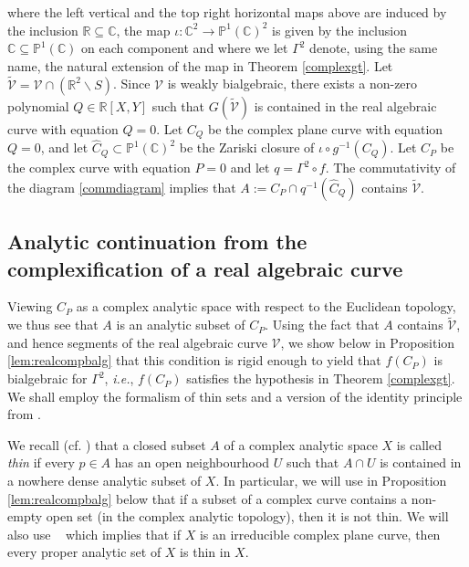 \documentclass[11pt,reqno]{amsart}
\theoremstyle{definition}
\numberwithin{equation}{section}
\renewcommand{\tilde}{\widetilde}
\renewcommand{\Pr}{\mathbb{P}}
\newcommand{\cV}{\mathcal{V}}
\begin{document}
where the left vertical and the top right horizontal maps above are induced by the inclusion $\mathbb R \subseteq \mathbb C$, the map $\iota: \mathbb C^2 \rightarrow \mathbb P^1(\mathbb C)^2$ is given by the inclusion $\mathbb C \subseteq  \mathbb P^1(\mathbb C)$ on each component and where we let $\Gamma^2$ denote, using the same name, the natural extension of the map in Theorem \ref{complexgt}.  
Let $\tilde{\cV}=\cV \cap  (\mathbb R^2  \smallsetminus S)$. Since $\cV$ is weakly bialgebraic, there exists a non-zero polynomial $Q \in \mathbb R[X, Y]$ such that $G(\tilde{\cV})$ is contained in the real algebraic curve with equation $Q=0$. Let $C_Q$ be the complex plane curve with equation $Q=0$, and let $\hat{C}_Q\subset \Pr^1(\mathbb C)^2$ be the Zariski closure of $\iota \circ g^{-1}(C_Q)$. Let $C_P$ be the complex curve with equation $P=0$ and let $q=\Gamma^2 \circ f$. The commutativity of the diagram \eqref{commdiagram} implies that $A:=C_P \cap q^{-1}(\hat{C}_Q)$ contains $\tilde{\cV}$.











\subsection{Analytic continuation from the complexification of a real algebraic curve}
Viewing $C_P$ as a complex analytic space with respect to the Euclidean topology, we thus see that $A$ is an analytic subset of $C_P$.   %
Using the fact that $A$ contains $\tilde{\cV}$, and hence segments of the real algebraic curve $\mathcal V$, we show below in Proposition \ref{lem:realcompbalg} that this condition is rigid enough to yield that $f(C_P)$ is bialgebraic for $\Gamma^2$, \textit{i.e.}, $f(C_P)$ satisfies the hypothesis in Theorem \ref{complexgt}. We shall employ the formalism of thin sets and a version of the identity principle from \cite{GR84}. 




We recall (cf. \cite[page 132]{GR84}) that a closed subset $A$ of a complex analytic space $X$ is called \textit{thin} if every $p \in A$ has an open neighbourhood $U$ such that $A \cap U$ is contained in a nowhere dense analytic subset of $X$.
In particular, we will use in Proposition \ref{lem:realcompbalg} below that if a subset of a complex curve contains a non-empty open set (in the complex analytic topology), then it is not thin.   
We will also use  ~\cite[Theorem, page 168]{GR84}  
which implies that if $X$ is an irreducible complex plane curve, then every proper analytic set of $X$ is thin in $X$. 
\end{document}
